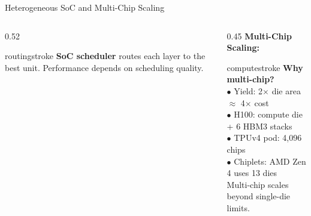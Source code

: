 \documentclass[aspectratio=169, 12pt]{beamer}
\begin{document}
\begin{frame}{Heterogeneous SoC and Multi-Chip Scaling}
\begin{columns}[T]
\begin{column}{0.52\textwidth}
    \vspace{0.05cm}
    \begin{mlsyscard}{routingstroke}
    {\scriptsize \textbf{SoC scheduler} routes each layer to the best unit. Performance depends on scheduling quality.}
    \end{mlsyscard}
  \end{column}
  \begin{column}{0.45\textwidth}
    \textbf{Multi-Chip Scaling:}

    \vspace{0.05cm}
    \begin{mlsyscard}{computestroke}
    {\scriptsize
    \textbf{Why multi-chip?}\\
    $\bullet$ Yield: 2$\times$ die area $\approx$ 4$\times$ cost\\
    $\bullet$ H100: compute die + 6 HBM3 stacks\\
    $\bullet$ TPUv4 pod: 4,096 chips\\
    $\bullet$ Chiplets: AMD Zen 4 uses 13 dies\\[0.05cm]
    Multi-chip scales beyond single-die limits.
    }
    \end{mlsyscard}

    \vspace{0.05cm}
  \end{column}
\end{columns}

\end{frame}
\end{document}
